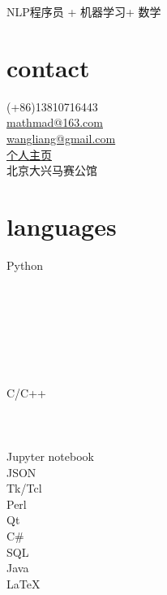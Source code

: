 \documentclass[letterpaper,10pt]{Resume_Liang}
\begin{document}
\thispagestyle{empty}
 {NLP程序员 + 机器学习+ 数学}
\begin{aside}
  \section{contact}
    (+86)13810716443\\
    \href{mailto:mathmad@163.com}{mathmad@163.com}\\
    \href{mailto:wangliangster@gmail.com}{wangliang@gmail.com}\\
    \href{https://wangliangster.github.io}{个人主页}\\
    北京大兴马赛公馆\\
   \vspace{\baselineskip}
  \section{languages}
    Python\\
    \\
    \\
    \\
    \\
    \\
    \\
    \\
    C/C++\\
    \\
    \\
    \\
    Jupyter notebook\\
    JSON\\
    Tk/Tcl\\
    Perl\\
    Qt\\
    C\#\\
    SQL\\
    Java\\
    \LaTeX \\
   \vspace{\baselineskip}

\end{aside}
\end{document}
